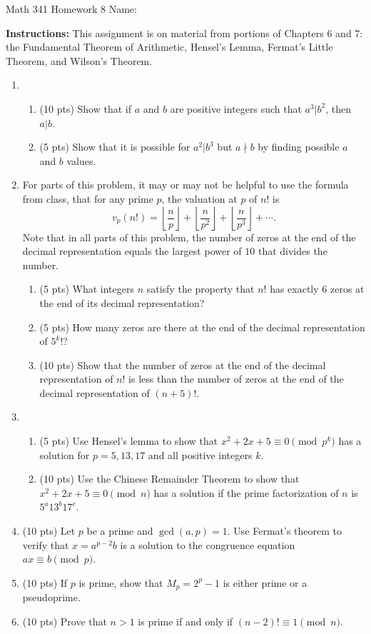 \documentclass[12pt]{article}
\begin{document}
	Math 341 Homework 8
	\hfill
	Name: \underline{\hspace*{2in}}
	
	\textbf{Instructions:} This assignment is on material from portions of Chapters 6 and 7: the Fundamental Theorem of Arithmetic, Hensel's Lemma, Fermat's Little Theorem, and Wilson's Theorem.
\begin{enumerate}
	\item 
		\begin{enumerate}
			\item (10 pts) Show that if $a$ and $b$ are positive integers such that $a^3|b^2$, then $a|b$.\vfill
			\item (5 pts) Show that it is possible for $a^2|b^3$ but $a\nmid b$ by finding possible $a$ and $b$ values.\vskip 2in
		\end{enumerate}
	\newpage
	\item  For parts of this problem, 			
			it may or may not be helpful to use the formula from class, that for any prime $p$, the valuation at $p$ of $n!$ is $$v_p(n!)=\left\lfloor\frac{n}{p}\right\rfloor+\left\lfloor\frac{n}{p^2}\right\rfloor+\left\lfloor\frac{n}{p^3}\right\rfloor+\cdots.$$
		  Note that in all parts of this problem, the number of zeros at the end of the decimal representation equals the largest power of $10$ that divides the number.
		\begin{enumerate}
			\item (5 pts) What integers $n$ satisfy the property that $n!$ has exactly $6$ zeros at the end of its decimal representation?
			\vskip 1in
			\item (5 pts) How many zeros are there at the end of the decimal representation of $5^k!$?
			\vskip 1in
			\item (10 pts) 
			Show that the number of zeros at the end of the decimal representation of $n!$ is less than the number of zeros at the end of the decimal representation of $(n+5)!$.

			\vfill
			
		\end{enumerate}
	\newpage
	\item \begin{enumerate}
		\item(5 pts) Use Hensel's lemma to show that $x^2+2x+5\equiv 0\pmod p^k$ has a solution for $p=5,13,17$ and all positive integers $k$.\vfill
		\item(10 pts) Use the Chinese Remainder Theorem to show that $x^2+2x+5\equiv 0\pmod n$ has a solution if the prime factorization of $n$ is $5^a13^b17^c$.\vfill
	\end{enumerate}
	\newpage
	\item (10 pts) Let $p$ be a prime and $\gcd(a,p)=1$. Use Fermat's theorem to verify that $x=a^{p-2}b$ is a solution to the congruence equation $ax\equiv b\pmod p$.\vfill
	\item (10 pts) If $p$ is prime, show that $M_p=2^p-1$ is either prime or a pseudoprime.
	\vfill
	\newpage
	\item (10 pts) Prove that $n>1$ is prime if and only if $(n-2)!\equiv 1\pmod n$.
\end{enumerate}
\end{document}
